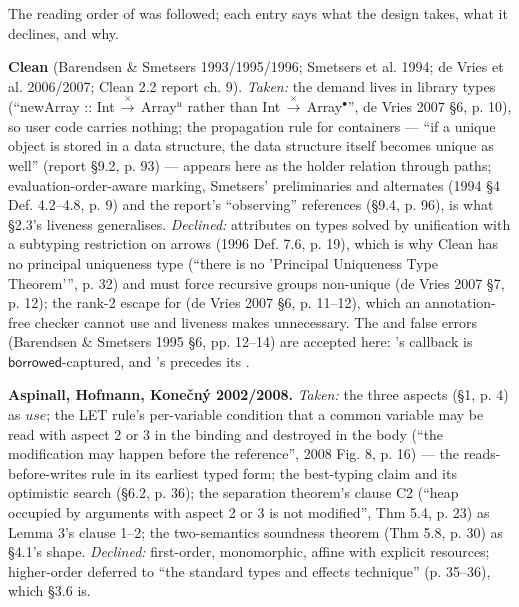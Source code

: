 
The reading order of  was followed; each entry says what the design takes, what it declines, and why.

\textbf{Clean} (Barendsen \& Smetsers 1993/1995/1996; Smetsers et al. 1994; de Vries et al. 2006/2007; Clean 2.2 report ch. 9). \emph{Taken:} the demand lives in library types (“newArray :: Int\,$\xrightarrow{\times}$\,Array$^{u}$ rather than Int\,$\xrightarrow{\times}$\,Array$^{\bullet}$”, de Vries 2007 §6, p. 10), so user code carries nothing; the propagation rule for containers — “if a unique object is stored in a data structure, the data structure itself becomes unique as well” (report §9.2, p. 93) — appears here as the holder relation through paths; evaluation-order-aware marking, Smetsers' preliminaries and alternates (1994 §4 Def. 4.2–4.8, p. 9) and the report's “observing” references (§9.4, p. 96), is what §2.3's liveness generalises. \emph{Declined:} attributes on types solved by unification with a subtyping restriction on arrows (1996 Def. 7.6, p. 19), which is why Clean has no principal uniqueness type (“there is no 'Principal Uniqueness Type Theorem'”, p. 32) and must force recursive groups non-unique (de Vries 2007 §7, p. 12); the rank-2 escape for  (de Vries 2007 §6, p. 11–12), which an annotation-free checker cannot use and liveness makes unnecessary. The  and  false errors (Barendsen \& Smetsers 1995 §6, pp. 12–14) are accepted here: 's callback is $\mathsf{borrowed}$-captured, and 's  precedes its .

\textbf{Aspinall, Hofmann, Konečný 2002/2008.} \emph{Taken:} the three aspects (§1, p. 4) as $\mathit{use}$; the LET rule's per-variable condition that a common variable may be read with aspect 2 or 3 in the binding and destroyed in the body (“the modification may happen before the reference”, 2008 Fig. 8, p. 16) — the reads-before-writes rule in its earliest typed form; the best-typing claim and its optimistic search (§6.2, p. 36); the separation theorem's clause C2 (“heap occupied by arguments with aspect 2 or 3 is not modified”, Thm 5.4, p. 23) as Lemma 3's clause 1–2; the two-semantics soundness theorem (Thm 5.8, p. 30) as §4.1's shape. \emph{Declined:} first-order, monomorphic, affine with explicit  resources; higher-order deferred to “the standard types and effects technique” (p. 35–36), which §3.6 is.

